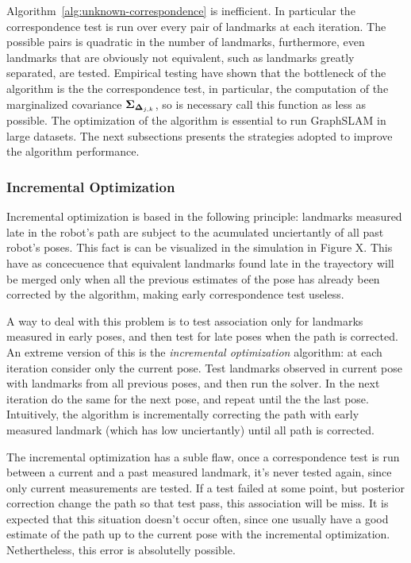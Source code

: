 Algorithm~\ref{alg:unknown-correspondence} is inefficient. In particular the correspondence test is run over every pair of landmarks at each iteration. The possible pairs is quadratic in the number of landmarks, furthermore, even landmarks that are obviously not equivalent, such as landmarks greatly separated, are tested. Empirical testing have shown that the bottleneck of the algorithm is the the correspondence test, in particular, the computation of the marginalized covariance $\boldsymbol{\Sigma}_{\boldsymbol{\Delta}_{j,k}}$, so is necessary call this function as less as possible. The optimization of the algorithm is essential to run GraphSLAM in large datasets. The next subsections presents the strategies adopted to improve the algorithm performance.

\subsubsection{Incremental Optimization}

Incremental optimization is based in the following principle: landmarks measured late in the robot's path are subject to the acumulated unciertantly of all past robot's poses. This fact is can be visualized in the simulation in Figure X. This have as concecuence that equivalent landmarks found late in the trayectory will be merged only when all the previous estimates of the pose has already been corrected by the algorithm, making early correspondence test useless.

A way to deal with this problem is to test association only for landmarks measured in early poses, and then test for late poses when the path is corrected. An extreme version of this is the \emph{incremental optimization} algorithm: at each iteration consider only the current pose. Test landmarks observed in current pose with landmarks from all previous poses, and then run the solver. In the next iteration do the same for the next pose, and repeat until the the last pose. Intuitively, the algorithm is incrementally correcting the path with early measured landmark (which has low unciertantly) until all path is corrected. 

The incremental optimization has a suble flaw, once a correspondence test is run between a current and a past measured landmark, it's never tested again, since only current measurements are tested. 
If a test failed at some point, but posterior correction change the path so that test pass, this association will be miss. It is expected that this situation doesn't occur often, since one usually have a good estimate of the path up to the current pose with the incremental optimization. Nethertheless, this error is absolutelly possible.

